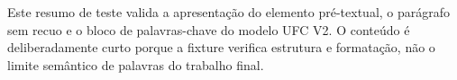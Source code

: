 Este resumo de teste valida a apresentação do elemento pré-textual, o parágrafo sem recuo e o bloco de palavras-chave do modelo UFC V2. O conteúdo é deliberadamente curto porque a fixture verifica estrutura e formatação, não o limite semântico de palavras do trabalho final.

